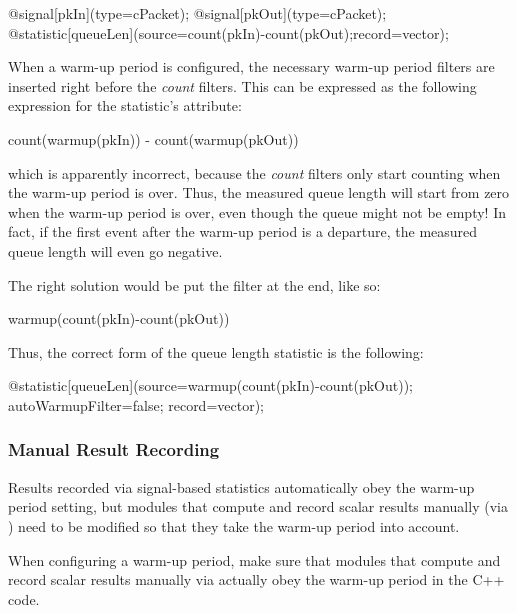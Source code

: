 \begin{ned}
@signal[pkIn](type=cPacket);
@signal[pkOut](type=cPacket);
@statistic[queueLen](source=count(pkIn)-count(pkOut);record=vector);
\end{ned}

When a warm-up period is configured, the necessary warm-up period filters are
inserted right before the \textit{count} filters. This can be expressed as the
following expression for the statistic's  attribute:

\begin{ned}
count(warmup(pkIn)) - count(warmup(pkOut))
\end{ned}

which is apparently incorrect, because the \textit{count} filters only start
counting when the warm-up period is over. Thus, the measured queue length will
start from zero when the warm-up period is over, even though the queue might not
be empty! In fact, if the first event after the warm-up period is a departure,
the measured queue length will even go negative.

The right solution would be put the  filter at the end, like so:

\begin{ned}
warmup(count(pkIn)-count(pkOut))
\end{ned}

Thus, the correct form of the queue length statistic is the following:

\begin{ned}
@statistic[queueLen](source=warmup(count(pkIn)-count(pkOut));
                     autoWarmupFilter=false;
                     record=vector);
\end{ned}


\subsubsection{Manual Result Recording}

Results recorded via signal-based statistics automatically obey the warm-up
period setting, but modules that compute and record scalar results
manually (via ) need to be modified so that they take
the warm-up period into account.

\begin{note}
When configuring a warm-up period, make sure that modules that compute and
record scalar results manually via  actually obey the
warm-up period in the C++ code.
\end{note}

